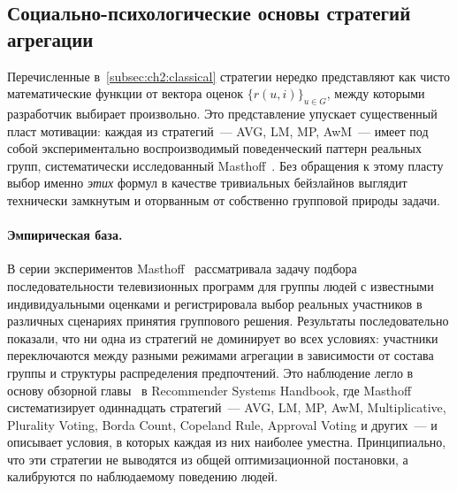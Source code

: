 \subsection{Социально-психологические основы стратегий агрегации}
\label{subsec:ch2:psychology}

Перечисленные в~\ref{subsec:ch2:classical} стратегии нередко представляют как чисто математические функции от вектора оценок $\{r(u, i)\}_{u \in G}$, между которыми разработчик выбирает произвольно. Это представление упускает существенный пласт мотивации: каждая из стратегий~--- AVG, LM, MP, AwM~--- имеет под собой экспериментально воспроизводимый поведенческий паттерн реальных групп, систематически исследованный Masthoff~\cite{masthoff2004group, masthoff2011handbook}. Без обращения к этому пласту выбор именно \emph{этих} формул в качестве тривиальных бейзлайнов выглядит технически замкнутым и оторванным от собственно групповой природы задачи.

\paragraph{Эмпирическая база.} В серии экспериментов Masthoff~\cite{masthoff2004group} рассматривала задачу подбора последовательности телевизионных программ для группы людей с известными индивидуальными оценками и регистрировала выбор реальных участников в различных сценариях принятия группового решения. Результаты последовательно показали, что ни одна из стратегий не доминирует во всех условиях: участники переключаются между разными режимами агрегации в зависимости от состава группы и структуры распределения предпочтений. Это наблюдение легло в основу обзорной главы~\cite{masthoff2011handbook} в Recommender Systems Handbook, где Masthoff систематизирует одиннадцать стратегий~--- AVG, LM, MP, AwM, Multiplicative, Plurality Voting, Borda Count, Copeland Rule, Approval Voting и других~--- и описывает условия, в которых каждая из них наиболее уместна. Принципиально, что эти стратегии не выводятся из общей оптимизационной постановки, а калибруются по наблюдаемому поведению людей.


